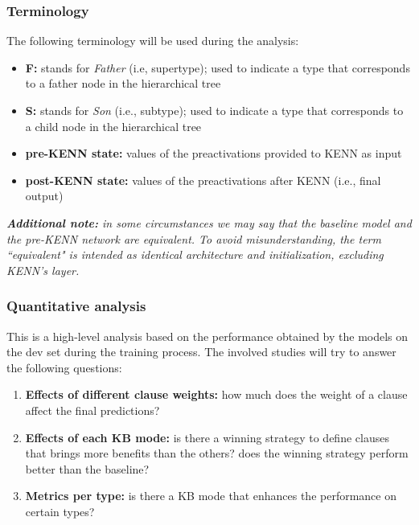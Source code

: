 \subsubsection{Terminology}
The following terminology will be used during the analysis:
\begin{itemize}
    \item \textbf{F:} stands for \textit{Father} (i.e, supertype); used to indicate a type that corresponds to a father node in the hierarchical tree
    \item \textbf{S:} stands for \textit{Son} (i.e., subtype); used to indicate a type that corresponds to a child node in the hierarchical tree
    \item \textbf{pre-KENN state:} values of the preactivations provided to KENN as input
    \item \textbf{post-KENN state:} values of the preactivations after KENN (i.e., final output)
\end{itemize}
\textit{\textbf{Additional note:} in some circumstances we may say that the baseline model and the pre-KENN network are equivalent. To avoid misunderstanding, the term ``equivalent" is intended as identical architecture and initialization, excluding KENN's layer.}


\subsubsection{Quantitative analysis} \label{quantitative_analysis}
This is a high-level analysis based on the performance obtained by the models on the dev set during the training process. The involved studies will try to answer the following questions:
\begin{enumerate}
    \item \textbf{Effects of different clause weights:} how much does the weight of a clause affect the final predictions?
    \item \textbf{Effects of each KB mode:} is there a winning strategy to define clauses that brings more benefits than the others? does the winning strategy perform better than the baseline?
    \item \textbf{Metrics per type:} is there a KB mode that enhances the performance on certain types?
\end{enumerate}

